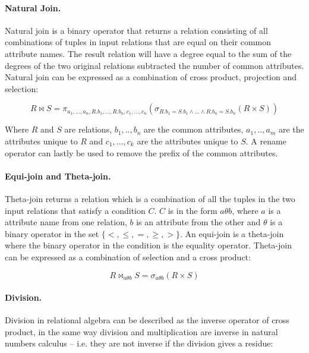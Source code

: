 \paragraph{Natural Join.}
\label{sect:theory:relAlg:naturalJoin}
Natural join is a binary operator that returns a relation consisting of all combinations of tuples in input
relations that are equal on their common attribute names. The result relation will have a degree equal to the sum
of the degrees of the two original relations subtracted the number of common attributes. Natural join can be
expressed as a combination of cross product, projection and selection:

\begin{equation*}
R \bowtie S = \pi_{a_{1},..., a_{n},R.b_{1},...,R.b_{n},c_{1},...,c_{n}}( \sigma _{R.b_{1}=S.b_{1} \wedge ... \wedge R.b_{n}=S.b_{n}}(R \times S))
\end{equation*}

Where $R$ and $S$ are relations, $b_{1},..,b_{n}$ are the common attributes, $a_{1},..,a_{m}$ are the attributes
unique to $R$ and $c_{1},...,c_{k}$ are the attributes unique to $S$. A rename operator can lastly be used to
remove the prefix of the common attributes.

\paragraph{Equi-join and Theta-join.}
\label{sect:theory:relAlg:equiAndThetaJoin}
Theta-join returns a relation which is a combination of all the tuples in the two input relations that satisfy a
condition $C$. $C$ is in the form $a \theta b$, where $a$ is a attribute name from one relation, $b$ is an
attribute from the other and $ \theta $ is a binary operator in the set $ \{ <, \leq , =, \geq , >  \} $. An
equi-join is a theta-join where the binary operator in the condition is the equality operator. Theta-join can be
expressed as a combination of selection and a cross product:

\begin{equation*}
R \bowtie _{a \theta b}S = \sigma _{a \theta b}(R \times S)
\end{equation*}

\paragraph{Division.}
\label{sect:theory:relAlg:division}
Division in relational algebra can be described as the inverse operator of cross product, in the same way division
and multiplication are inverse in natural numbers calculus -- i.e. they are not inverse if the division gives a
residue:

